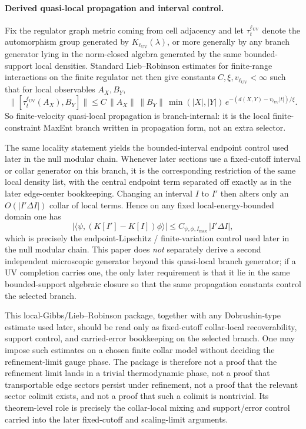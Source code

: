 \documentclass[11pt]{article}
\begin{document}
\paragraph{Derived quasi-local propagation and interval control.}
Fix the regulator graph metric coming from cell adjacency and let \(\tau_t^{\ell_{\mathrm{UV}}}\) denote the automorphism group generated by \(K_{\ell_{\mathrm{UV}}}(\lambda)\), or more generally by any branch generator lying in the norm-closed algebra generated by the same bounded-support local densities. Standard Lieb--Robinson estimates for finite-range interactions on the finite regulator net then give constants \(C,\xi,v_{\ell_{\mathrm{UV}}}<\infty\) such that for local observables \(A_X,B_Y\), \cite{liebRobinson72}
\[
\bigl\|[\tau_t^{\ell_{\mathrm{UV}}}(A_X),B_Y]\bigr\|
\le
C\,\|A_X\|\,\|B_Y\|\,\min(|X|,|Y|)\,
e^{-(d(X,Y)-v_{\ell_{\mathrm{UV}}}|t|)/\xi}.
\]
So finite-velocity quasi-local propagation is branch-internal: it is the local finite-constraint MaxEnt branch written in propagation form, not an extra selector.

The same locality statement yields the bounded-interval endpoint control used later in the null modular chain. Whenever later sections use a fixed-cutoff interval or collar generator on this branch, it is the corresponding restriction of the same local density list, with the central endpoint term separated off exactly as in the later edge-center bookkeeping. Changing an interval \(I\) to \(I'\) then alters only an \(O(|I'\Delta I|)\) collar of local terms. Hence on any fixed local-energy-bounded domain one has
\[
\left|\langle\psi,(K[I']-K[I])\phi\rangle\right|
\le
C_{\psi,\phi,I_{\max}}\,|I'\Delta I|,
\]
which is precisely the endpoint-Lipschitz / finite-variation control used later in the null modular chain. This paper does \emph{not} separately derive a second independent microscopic generator beyond this quasi-local branch generator; if a UV completion carries one, the only later requirement is that it lie in the same bounded-support algebraic closure so that the same propagation constants control the selected branch.

This local-Gibbs/Lieb--Robinson package, together with any Dobrushin-type estimate used later, should be read only as fixed-cutoff collar-local recoverability, support control, and carried-error bookkeeping on the selected branch. One may impose such estimates on a chosen finite collar model without deciding the refinement-limit gauge phase. The package is therefore not a proof that the refinement limit lands in a trivial thermodynamic phase, not a proof that transportable edge sectors persist under refinement, not a proof that the relevant sector colimit exists, and not a proof that such a colimit is nontrivial. Its theorem-level role is precisely the collar-local mixing and support/error control carried into the later fixed-cutoff and scaling-limit arguments.
\end{document}
